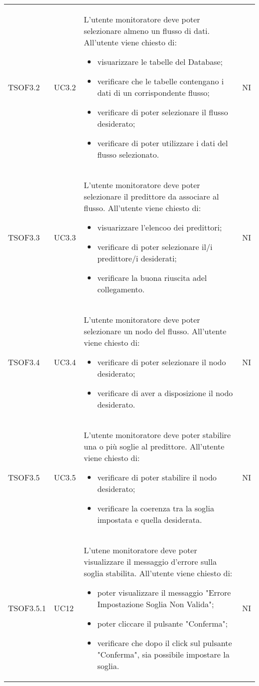 \begin{longtable}{C{2.5cm} C{2.5cm} L{8cm} C{2cm}}
TSOF3.2 &
UC3.2 &
L'utente monitoratore deve poter selezionare almeno un flusso di dati. All'utente viene chiesto di:
\begin{itemize}
	\item visuarizzare le tabelle del Database;
	\item verificare che le tabelle contengano i dati di un corrispondente flusso;
	\item verificare di poter selezionare il flusso desiderato;
	\item verificare di poter utilizzare i dati del flusso selezionato.
\end{itemize}&
NI \\

TSOF3.3 &
UC3.3 &
L'utente monitoratore deve poter selezionare il predittore da associare al flusso. All'utente viene chiesto di:
\begin{itemize}
	\item visuarizzare l'elencoo dei predittori;
	\item verificare di poter selezionare il/i predittore/i desiderati;
	\item verificare la buona riuscita adel collegamento.
\end{itemize}&
NI \\

TSOF3.4 &
UC3.4 &
L'utente monitoratore deve poter selezionare un nodo del flusso. All'utente viene chiesto di:
\begin{itemize}
	\item verificare di poter selezionare il nodo desiderato;
	\item verificare di aver a disposizione il nodo desiderato.
\end{itemize}&
NI \\

TSOF3.5 &
UC3.5 &
L'utente monitoratore deve poter stabilire una o più soglie al predittore. All'utente viene chiesto di:
\begin{itemize}
	\item verificare di poter stabilire il nodo desiderato;
	\item verificare la coerenza tra la soglia impostata e quella desiderata.
\end{itemize}&
NI \\

TSOF3.5.1 &
UC12 &
L'utene monitoratore deve poter visualizzare il messaggio d'errore sulla soglia stabilita. All'utente viene chiesto di:
\begin{itemize}
	\item poter visualizzare il messaggio "Errore Impostazione Soglia Non Valida";
	\item poter cliccare il pulsante "Conferma";
	\item verificare che dopo il click sul pulsante "Conferma", sia possibile impostare la soglia.
\end{itemize} &
NI \\


\end{longtable}
